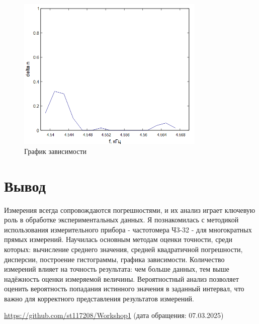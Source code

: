 \begin{figure}[ht!]
\centering
\includegraphics[width=0.8\textwidth]{Plot4.png}
\caption{График зависимости}
\label{fig:plot4}
\end{figure}

\section{Вывод}
Измерения всегда сопровождаются погрешностями, и их анализ играет ключевую роль в обработке экспериментальных данных. Я познакомилась с методикой использования измерительного прибора - частотомера Ч3-32 - для многократных прямых измерений. Научилась основным методам оценки точности, среди которых: вычисление среднего значения, средней квадратичной погрешности, дисперсии, построение гистограммы, графика зависимости. Количество измерений влияет на точность результата: чем больше данных, тем выше надёжность оценки измеряемой величины. Вероятностный анализ позволяет оценить вероятность попадания истинного значения в заданный интервал, что важно для корректного представления результатов измерений. 


\url{https://github.com/st117208/Workshop1}  (дата обращения: 07.03.2025)
